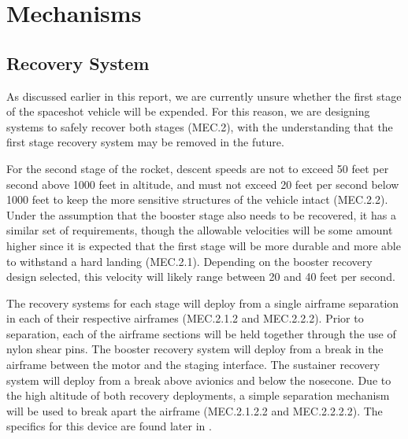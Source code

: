 \section{Mechanisms} \label{section:mechanisms}
\subsection{Recovery System}  %

As discussed earlier in this report, we are currently unsure whether the first stage of the space\-shot vehicle will be expended. For this reason, we are designing systems to safely recover both stages (MEC.2), with the understanding that the first stage recovery system may be removed in the future.

For the second stage of the rocket, descent speeds are not to exceed 50 feet per second above 1000 feet in altitude, and must not exceed 20 feet per second below 1000 feet to keep the more sensitive structures of the vehicle intact (MEC.2.2). Under the assumption that the booster stage also needs to be recovered, it has a similar set of requirements, though the allowable velocities will be some amount higher since it is expected that the first stage will be more durable and more able to withstand a hard landing (MEC.2.1). Depending on the booster recovery design selected, this velocity will likely range between 20 and 40 feet per second.

The recovery systems for each stage will deploy from a single airframe separation in each of their respective airframes (MEC.2.1.2 and MEC.2.2.2). Prior to separation, each of the airframe sections will be held together through the use of nylon shear pins. The booster recovery system will deploy from a break in the airframe between the motor and the staging interface. The sustainer recovery system will deploy from a break above avionics and below the nosecone. Due to the high altitude of both recovery deployments, a simple separation mechanism will be used to break apart the airframe (MEC.2.1.2.2 and MEC.2.2.2.2). The specifics for this device are found later in .

